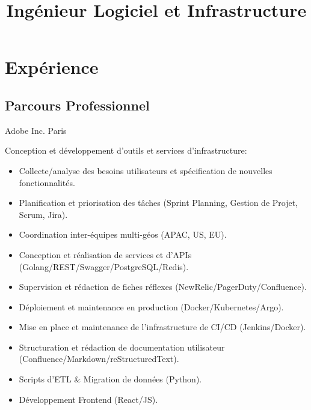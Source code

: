 \documentclass[10pt,a4paper,sans]{moderncv}
\title{Ingénieur Logiciel et Infrastructure}
\begin{document}
\maketitle


\section{Expérience}
\subsection{Parcours Professionnel}

        {Adobe Inc.}
        {Paris}
        {}
        {}

        {}
        {}
        {}
        {Conception et développement d'outils et services d'infrastructure:
            \begin{itemize}
            \item Collecte/analyse des besoins utilisateurs et spécification de nouvelles fonctionnalités.
            \item Planification et priorisation des tâches (Sprint Planning, Gestion de Projet, Scrum, Jira).
            \item Coordination inter-équipes multi-géos (APAC, US, EU).
            \item Conception et réalisation de services et d'APIs (Golang/REST/Swagger/PostgreSQL/Redis).
            \item Supervision et rédaction de fiches réflexes (NewRelic/PagerDuty/Confluence).
            \item Déploiement et maintenance en production (Docker/Kubernetes/Argo).
            \item Mise en place et maintenance de l'infrastructure de CI/CD (Jenkins/Docker).
            \item Structuration et rédaction de documentation utilisateur (Confluence/Markdown/reStructuredText).
            \item Scripts d'ETL \& Migration de données (Python).
            \item Développement Frontend (React/JS).
            \end{itemize}
        }
\end{document}
